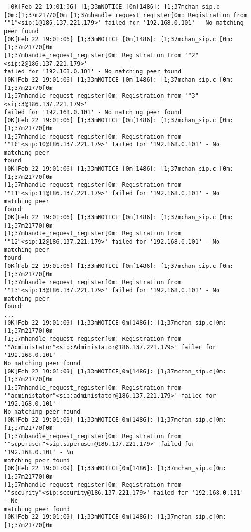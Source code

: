 \documentclass[a4paper,12pt]{report}
\newenvironment{myscriptlisting}
{\begin{list}{}{\setlength{\leftmargin}{1em}}\item\scriptsize\bfseries}
{\end{list}}
\begin{document}
{\begin{myscriptlisting}
 \begin{verbatim}
 [0K[Feb 22 19:01:06] [1;33mNOTICE [0m[1486]: [1;37mchan_sip.c
[0m:[1;37m21770[0m [1;37mhandle_request_register[0m: Registration from
'"1"<sip:1@186.137.221.179>' failed for '192.168.0.101' - No matching peer found
[0K[Feb 22 19:01:06] [1;33mNOTICE [0m[1486]: [1;37mchan_sip.c [0m:[1;37m21770[0m
[1;37mhandle_request_register[0m: Registration from '"2"<sip:2@186.137.221.179>'
failed for '192.168.0.101' - No matching peer found
[0K[Feb 22 19:01:06] [1;33mNOTICE [0m[1486]: [1;37mchan_sip.c [0m:[1;37m21770[0m
[1;37mhandle_request_register[0m: Registration from '"3"<sip:3@186.137.221.179>'
failed for '192.168.0.101' - No matching peer found
[0K[Feb 22 19:01:06] [1;33mNOTICE [0m[1486]: [1;37mchan_sip.c [0m:[1;37m21770[0m
[1;37mhandle_request_register[0m: Registration from
'"10"<sip:10@186.137.221.179>' failed for '192.168.0.101' - No matching peer
found
[0K[Feb 22 19:01:06] [1;33mNOTICE [0m[1486]: [1;37mchan_sip.c [0m:[1;37m21770[0m
[1;37mhandle_request_register[0m: Registration from
'"11"<sip:11@186.137.221.179>' failed for '192.168.0.101' - No matching peer
found
[0K[Feb 22 19:01:06] [1;33mNOTICE [0m[1486]: [1;37mchan_sip.c [0m:[1;37m21770[0m
[1;37mhandle_request_register[0m: Registration from
'"12"<sip:12@186.137.221.179>' failed for '192.168.0.101' - No matching peer
found
[0K[Feb 22 19:01:06] [1;33mNOTICE [0m[1486]: [1;37mchan_sip.c [0m:[1;37m21770[0m
[1;37mhandle_request_register[0m: Registration from
'"13"<sip:13@186.137.221.179>' failed for '192.168.0.101' - No matching peer
found
...
[0K[Feb 22 19:01:09] [1;33mNOTICE[0m[1486]: [1;37mchan_sip.c[0m:[1;37m21770[0m
[1;37mhandle_request_register[0m: Registration from
'"Administator"<sip:Administator@186.137.221.179>' failed for '192.168.0.101' -
No matching peer found
[0K[Feb 22 19:01:09] [1;33mNOTICE[0m[1486]: [1;37mchan_sip.c[0m:[1;37m21770[0m
[1;37mhandle_request_register[0m: Registration from
'"administator"<sip:administator@186.137.221.179>' failed for '192.168.0.101' -
No matching peer found
[0K[Feb 22 19:01:09] [1;33mNOTICE[0m[1486]: [1;37mchan_sip.c[0m:[1;37m21770[0m
[1;37mhandle_request_register[0m: Registration from
'"superuser"<sip:superuser@186.137.221.179>' failed for '192.168.0.101' - No
matching peer found
[0K[Feb 22 19:01:09] [1;33mNOTICE[0m[1486]: [1;37mchan_sip.c[0m:[1;37m21770[0m
[1;37mhandle_request_register[0m: Registration from
'"security"<sip:security@186.137.221.179>' failed for '192.168.0.101' - No
matching peer found
[0K[Feb 22 19:01:09] [1;33mNOTICE[0m[1486]: [1;37mchan_sip.c[0m:[1;37m21770[0m

\end{verbatim}
\end{myscriptlisting}}
\end{document}
